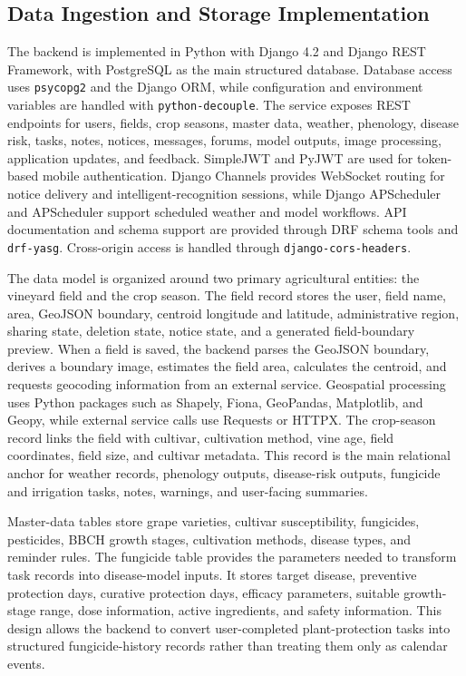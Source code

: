 \documentclass[11pt,a4paper]{article}
\begin{document}
\subsection{Data Ingestion and Storage Implementation}

The backend is implemented in Python with Django 4.2 and Django REST Framework, with PostgreSQL as the main structured database. Database access uses \texttt{psycopg2} and the Django ORM, while configuration and environment variables are handled with \texttt{python-decouple}. The service exposes REST endpoints for users, fields, crop seasons, master data, weather, phenology, disease risk, tasks, notes, notices, messages, forums, model outputs, image processing, application updates, and feedback. SimpleJWT and PyJWT are used for token-based mobile authentication. Django Channels provides WebSocket routing for notice delivery and intelligent-recognition sessions, while Django APScheduler and APScheduler support scheduled weather and model workflows. API documentation and schema support are provided through DRF schema tools and \texttt{drf-yasg}. Cross-origin access is handled through \texttt{django-cors-headers}.

The data model is organized around two primary agricultural entities: the vineyard field and the crop season. The field record stores the user, field name, area, GeoJSON boundary, centroid longitude and latitude, administrative region, sharing state, deletion state, notice state, and a generated field-boundary preview. When a field is saved, the backend parses the GeoJSON boundary, derives a boundary image, estimates the field area, calculates the centroid, and requests geocoding information from an external service. Geospatial processing uses Python packages such as Shapely, Fiona, GeoPandas, Matplotlib, and Geopy, while external service calls use Requests or HTTPX. The crop-season record links the field with cultivar, cultivation method, vine age, field coordinates, field size, and cultivar metadata. This record is the main relational anchor for weather records, phenology outputs, disease-risk outputs, fungicide and irrigation tasks, notes, warnings, and user-facing summaries.

Master-data tables store grape varieties, cultivar susceptibility, fungicides, pesticides, BBCH growth stages, cultivation methods, disease types, and reminder rules. The fungicide table provides the parameters needed to transform task records into disease-model inputs. It stores target disease, preventive protection days, curative protection days, efficacy parameters, suitable growth-stage range, dose information, active ingredients, and safety information. This design allows the backend to convert user-completed plant-protection tasks into structured fungicide-history records rather than treating them only as calendar events.
\end{document}
